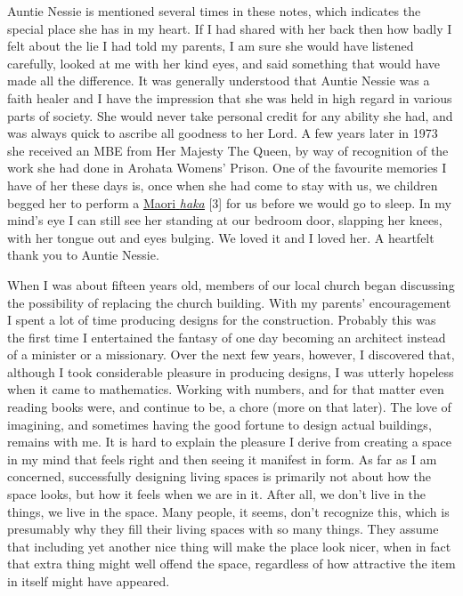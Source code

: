 Auntie Nessie is mentioned several times in these notes, which indicates
the special place she has in my heart. If I had shared with her back
then how badly I felt about the lie I had told my parents, I am sure she
would have listened carefully, looked at me with her kind eyes, and said
something that would have made all the difference. It was generally
understood that Auntie Nessie was a faith healer and I have the
impression that she was held in high regard in various parts of society.
She would never take personal credit for any ability she had, and was
always quick to ascribe all goodness to her Lord. A few years later in
1973 she received an MBE from Her Majesty The Queen, by way of
recognition of the work she had done in Arohata Womens' Prison. One of
the favourite memories I have of her these days is, once when she had
come to stay with us, we children begged her to perform a
\href{https://www.newzealand.com/us/feature/haka/}{\underline{Maori}
\emph{\underline{haka}}} {[}3{]} for us before we would go to sleep. In
my mind's eye I can still see her standing at our bedroom door, slapping
her knees, with her tongue out and eyes bulging. We loved it and I loved
her. A heartfelt thank you to Auntie Nessie.

When I was about fifteen years old, members of our local church began
discussing the possibility of replacing the church building. With my
parents' encouragement I spent a lot of time producing designs for the
construction. Probably this was the first time I entertained the fantasy
of one day becoming an architect instead of a minister or a missionary.
Over the next few years, however, I discovered that, although I took
considerable pleasure in producing designs, I was utterly hopeless when
it came to mathematics. Working with numbers, and for that matter even
reading books were, and continue to be, a chore (more on that later).
The love of imagining, and sometimes having the good fortune to design
actual buildings, remains with me. It is hard to explain the pleasure I
derive from creating a space in my mind that feels right and then seeing
it manifest in form. As far as I am concerned, successfully designing
living spaces is primarily not about how the space looks, but how it
feels when we are in it. After all, we don't live in the things, we live
in the space. Many people, it seems, don't recognize this, which is
presumably why they fill their living spaces with so many things. They
assume that including yet another nice thing will make the place look
nicer, when in fact that extra thing might well offend the space,
regardless of how attractive the item in itself might have appeared.

